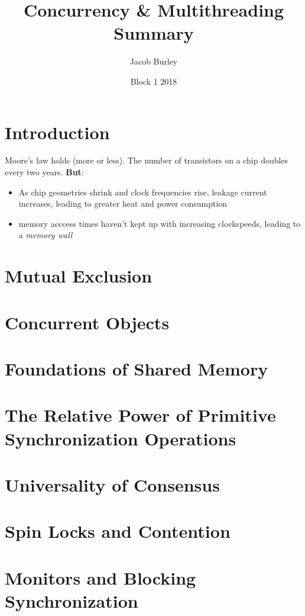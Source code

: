 \documentclass{article}
\title{Concurrency \& Multithreading Summary}
\author{Jacob Burley}
\date{Block 1 2018}
\begin{document}
\maketitle

\tableofcontents

\section{Introduction}
Moore's law holds (more or less). The number of transistors on a chip doubles every two years. \textbf{But}:
\begin{itemize}
    \item As chip geometries shrink and clock frequencies rise, leakage current increases, leading to greater heat and power consumption
    \item memory acccess times haven't kept up with increasing clockspeeds, leading to a \textit{memory wall}
\end{itemize}
\section{Mutual Exclusion}

\section{Concurrent Objects}

\section{Foundations of Shared Memory}

\section{The Relative Power of Primitive Synchronization Operations}

\section{Universality of Consensus}

\section{Spin Locks and Contention}

\section{Monitors and Blocking Synchronization}
\end{document}
